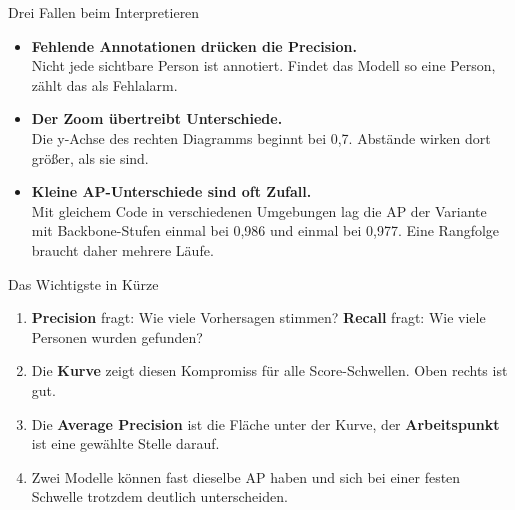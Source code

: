 \documentclass[aspectratio=169,11pt]{beamer}
\newcommand{\hl}[1]{\textbf{#1}}
\begin{document}
\begin{frame}{Drei Fallen beim Interpretieren}
  \begin{itemize}
    \setlength{\itemsep}{5mm}
    \item \hl{Fehlende Annotationen drücken die Precision.}\\
      Nicht jede sichtbare Person ist annotiert. Findet das Modell so eine Person, zählt das als Fehlalarm.
    \item \hl{Der Zoom übertreibt Unterschiede.}\\
      Die y-Achse des rechten Diagramms beginnt bei 0,7. Abstände wirken dort größer, als sie sind.
    \item \hl{Kleine AP-Unterschiede sind oft Zufall.}\\
      Mit gleichem Code in verschiedenen Umgebungen lag die AP der Variante mit Backbone-Stufen einmal bei 0,986 und einmal bei 0,977.
      Eine Rangfolge braucht daher mehrere Läufe.
  \end{itemize}
\end{frame}

\begin{frame}{Das Wichtigste in Kürze}
  \begin{enumerate}
    \setlength{\itemsep}{5mm}
    \item \hl{Precision} fragt: Wie viele Vorhersagen stimmen? \hl{Recall} fragt: Wie viele Personen wurden gefunden?
    \item Die \hl{Kurve} zeigt diesen Kompromiss für alle Score-Schwellen. Oben rechts ist gut.
    \item Die \hl{Average Precision} ist die Fläche unter der Kurve, der \hl{Arbeitspunkt} ist eine gewählte Stelle darauf.
    \item Zwei Modelle können fast dieselbe AP haben und sich bei einer festen Schwelle trotzdem deutlich unterscheiden.
  \end{enumerate}
\end{frame}
\end{document}
